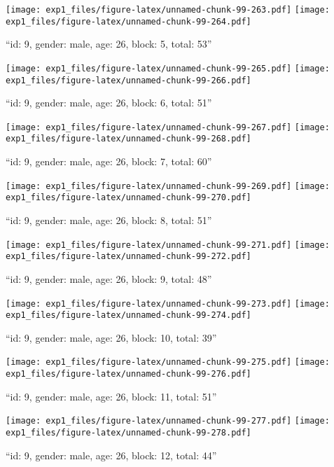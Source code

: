 \documentclass[,]{article}
\begin{document}
\texttt{[image: exp1\_files/figure-latex/unnamed-chunk-99-263.pdf]}
\texttt{[image: exp1\_files/figure-latex/unnamed-chunk-99-264.pdf]}

\newpage
[1] 

``id: 9, gender: male, age: 26, block: 5, total: 53''

\texttt{[image: exp1\_files/figure-latex/unnamed-chunk-99-265.pdf]}
\texttt{[image: exp1\_files/figure-latex/unnamed-chunk-99-266.pdf]}

\newpage
[1] 

``id: 9, gender: male, age: 26, block: 6, total: 51''

\texttt{[image: exp1\_files/figure-latex/unnamed-chunk-99-267.pdf]}
\texttt{[image: exp1\_files/figure-latex/unnamed-chunk-99-268.pdf]}

\newpage
[1] 

``id: 9, gender: male, age: 26, block: 7, total: 60''

\texttt{[image: exp1\_files/figure-latex/unnamed-chunk-99-269.pdf]}
\texttt{[image: exp1\_files/figure-latex/unnamed-chunk-99-270.pdf]}

\newpage
[1] 

``id: 9, gender: male, age: 26, block: 8, total: 51''

\texttt{[image: exp1\_files/figure-latex/unnamed-chunk-99-271.pdf]}
\texttt{[image: exp1\_files/figure-latex/unnamed-chunk-99-272.pdf]}

\newpage
[1] 

``id: 9, gender: male, age: 26, block: 9, total: 48''

\texttt{[image: exp1\_files/figure-latex/unnamed-chunk-99-273.pdf]}
\texttt{[image: exp1\_files/figure-latex/unnamed-chunk-99-274.pdf]}

\newpage
[1] 

``id: 9, gender: male, age: 26, block: 10, total: 39''

\texttt{[image: exp1\_files/figure-latex/unnamed-chunk-99-275.pdf]}
\texttt{[image: exp1\_files/figure-latex/unnamed-chunk-99-276.pdf]}

\newpage
[1] 

``id: 9, gender: male, age: 26, block: 11, total: 51''

\texttt{[image: exp1\_files/figure-latex/unnamed-chunk-99-277.pdf]}
\texttt{[image: exp1\_files/figure-latex/unnamed-chunk-99-278.pdf]}

\newpage
[1] 

``id: 9, gender: male, age: 26, block: 12, total: 44''
\end{document}
